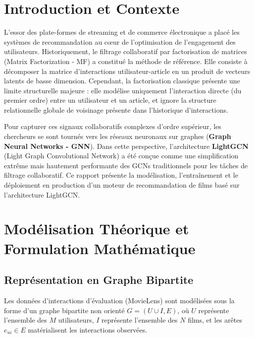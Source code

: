 \documentclass[12pt,a4paper]{article}
\begin{document}
\tableofcontents
\newpage

\section{Introduction et Contexte}
L'essor des plate-formes de streaming et de commerce électronique a placé les systèmes de recommandation au cœur de l'optimisation de l'engagement des utilisateurs. Historiquement, le filtrage collaboratif par factorisation de matrices (Matrix Factorization - MF) a constitué la méthode de référence. Elle consiste à décomposer la matrice d'interactions utilisateur-article en un produit de vecteurs latents de basse dimension. Cependant, la factorisation classique présente une limite structurelle majeure : elle modélise uniquement l'interaction directe (du premier ordre) entre un utilisateur et un article, et ignore la structure relationnelle globale de voisinage présente dans l'historique d'interactions.

Pour capturer ces signaux collaboratifs complexes d'ordre supérieur, les chercheurs se sont tournés vers les réseaux neuronaux sur graphes (\textbf{Graph Neural Networks - GNN}). Dans cette perspective, l'architecture \textbf{LightGCN} (Light Graph Convolutional Network) a été conçue comme une simplification extrême mais hautement performante des GCNs traditionnels pour les tâches de filtrage collaboratif. Ce rapport présente la modélisation, l'entraînement et le déploiement en production d'un moteur de recommandation de films basé sur l'architecture LightGCN.

\section{Modélisation Théorique et Formulation Mathématique}

\subsection{Représentation en Graphe Bipartite}
Les données d'interactions d'évaluation (MovieLens) sont modélisées sous la forme d'un graphe bipartite non orienté $G = (U \cup I, E)$, où $U$ représente l'ensemble des $M$ utilisateurs, $I$ représente l'ensemble des $N$ films, et les arêtes $e_{ui} \in E$ matérialisent les interactions observées.
\end{document}
